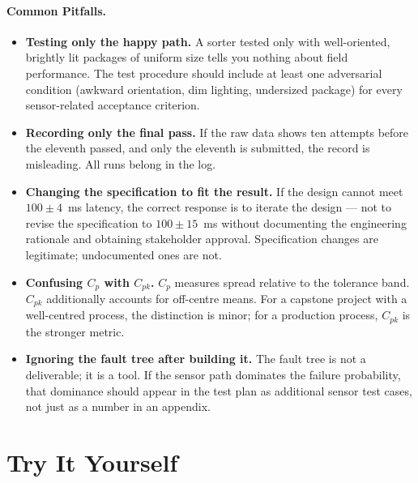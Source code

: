 \paragraph{Common Pitfalls.}
\begin{itemize}
  \item \textbf{Testing only the happy path.}
        A sorter tested only with well-oriented, brightly lit packages of uniform size
        tells you nothing about field performance.
        The test procedure should include at least one adversarial condition
        (awkward orientation, dim lighting, undersized package) for every sensor-related
        acceptance criterion.
  \item \textbf{Recording only the final pass.}
        If the raw data shows ten attempts before the eleventh passed, and only the
        eleventh is submitted, the record is misleading.
        All runs belong in the log.
  \item \textbf{Changing the specification to fit the result.}
        If the design cannot meet $100 \pm 4$~ms latency, the correct response is to
        iterate the design --- not to revise the specification to $100 \pm 15$~ms without
        documenting the engineering rationale and obtaining stakeholder approval.
        Specification changes are legitimate; undocumented ones are not.
  \item \textbf{Confusing $C_p$ with $C_{pk}$.}
        $C_p$ measures spread relative to the tolerance band.
        $C_{pk}$ additionally accounts for off-centre means.
        For a capstone project with a well-centred process, the distinction is minor;
        for a production process, $C_{pk}$ is the stronger metric.
  \item \textbf{Ignoring the fault tree after building it.}
        The fault tree is not a deliverable; it is a tool.
        If the sensor path dominates the failure probability, that dominance should appear
        in the test plan as additional sensor test cases, not just as a number in an
        appendix.
\end{itemize}

\section*{Try It Yourself}
\label{sec:ch14-tryit}

